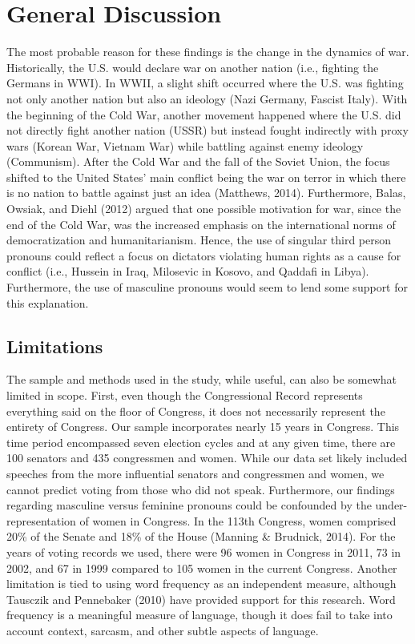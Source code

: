 \documentclass[english,man]{apa6}
\theoremstyle{definition}
\theoremstyle{definition}
\theoremstyle{definition}
\theoremstyle{remark}
\begin{document}
\section{General Discussion}\label{general-discussion}

The most probable reason for these findings is the change in the
dynamics of war. Historically, the U.S. would declare war on another
nation (i.e., fighting the Germans in WWI). In WWII, a slight shift
occurred where the U.S. was fighting not only another nation but also an
ideology (Nazi Germany, Fascist Italy). With the beginning of the Cold
War, another movement happened where the U.S. did not directly fight
another nation (USSR) but instead fought indirectly with proxy wars
(Korean War, Vietnam War) while battling against enemy ideology
(Communism). After the Cold War and the fall of the Soviet Union, the
focus shifted to the United States' main conflict being the war on
terror in which there is no nation to battle against just an idea
(Matthews, 2014). Furthermore, Balas, Owsiak, and Diehl (2012) argued
that one possible motivation for war, since the end of the Cold War, was
the increased emphasis on the international norms of democratization and
humanitarianism. Hence, the use of singular third person pronouns could
reflect a focus on dictators violating human rights as a cause for
conflict (i.e., Hussein in Iraq, Milosevic in Kosovo, and Qaddafi in
Libya). Furthermore, the use of masculine pronouns would seem to lend
some support for this explanation.

\subsection{Limitations}\label{limitations}

The sample and methods used in the study, while useful, can also be
somewhat limited in scope. First, even though the Congressional Record
represents everything said on the floor of Congress, it does not
necessarily represent the entirety of Congress. Our sample incorporates
nearly 15 years in Congress. This time period encompassed seven election
cycles and at any given time, there are 100 senators and 435 congressmen
and women. While our data set likely included speeches from the more
influential senators and congressmen and women, we cannot predict voting
from those who did not speak. Furthermore, our findings regarding
masculine versus feminine pronouns could be confounded by the
under-representation of women in Congress. In the 113th Congress, women
comprised 20\% of the Senate and 18\% of the House (Manning \& Brudnick,
2014). For the years of voting records we used, there were 96 women in
Congress in 2011, 73 in 2002, and 67 in 1999 compared to 105 women in
the current Congress. Another limitation is tied to using word frequency
as an independent measure, although Tausczik and Pennebaker (2010) have
provided support for this research. Word frequency is a meaningful
measure of language, though it does fail to take into account context,
sarcasm, and other subtle aspects of language.
\end{document}

